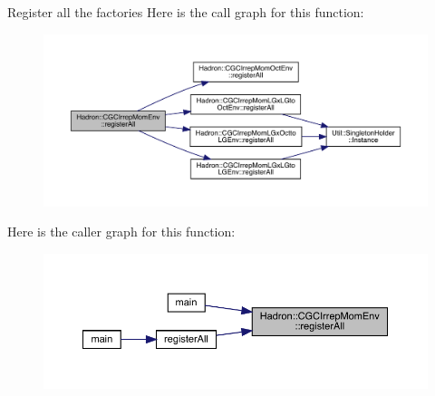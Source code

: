 Register all the factories Here is the call graph for this function\+:\nopagebreak
\begin{figure}[H]
\begin{center}
\leavevmode
\includegraphics[width=350pt]{d4/d33/namespaceHadron_1_1CGCIrrepMomEnv_af8421782c41f7dee9d5b4a17fc748862_cgraph}
\end{center}
\end{figure}
Here is the caller graph for this function\+:
\nopagebreak
\begin{figure}[H]
\begin{center}
\leavevmode
\includegraphics[width=350pt]{d4/d33/namespaceHadron_1_1CGCIrrepMomEnv_af8421782c41f7dee9d5b4a17fc748862_icgraph}
\end{center}
\end{figure}
